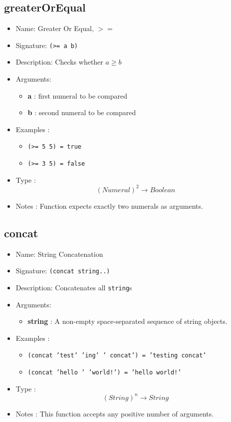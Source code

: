 \subsection{greaterOrEqual}
\begin{itemize}
    \item Name: Greater Or Equal, $>=$
    \item Signature: \texttt{(>= a b)}
    \item Description: Checks whether $a \ge b$
    \item Arguments:
        \begin{itemize}
            \item \textbf{a} : first numeral to be compared
            \item \textbf{b} : second numeral to be compared
        \end{itemize}
    \item Examples :
        \begin{itemize}
            \item \texttt{(>= 5 5) = true}
            \item \texttt{(>= 3 5) = false}
        \end{itemize}
    \item Type : \[(Numeral)^2 \to Boolean\]
    \item Notes : Function expects exactly two numerals as arguments.
\end{itemize}

\subsection{concat}
\begin{itemize}
    \item Name: String Concatenation
    \item Signature: \texttt{(concat string..)}
    \item Description: Concatenates all \texttt{string}s
    \item Arguments:
        \begin{itemize}
            \item \textbf{string} : A non-empty space-separated sequence of string objects.
        \end{itemize}
    \item Examples :
        \begin{itemize}
            \item \texttt{(concat 'test' 'ing' ' concat') = 'testing concat'}
            \item \texttt{(concat 'hello ' 'world!') = 'hello world!'}
        \end{itemize}
    \item Type : \[(String)^n \to String\]
    \item Notes : This function accepts any positive number of arguments.
\end{itemize}

